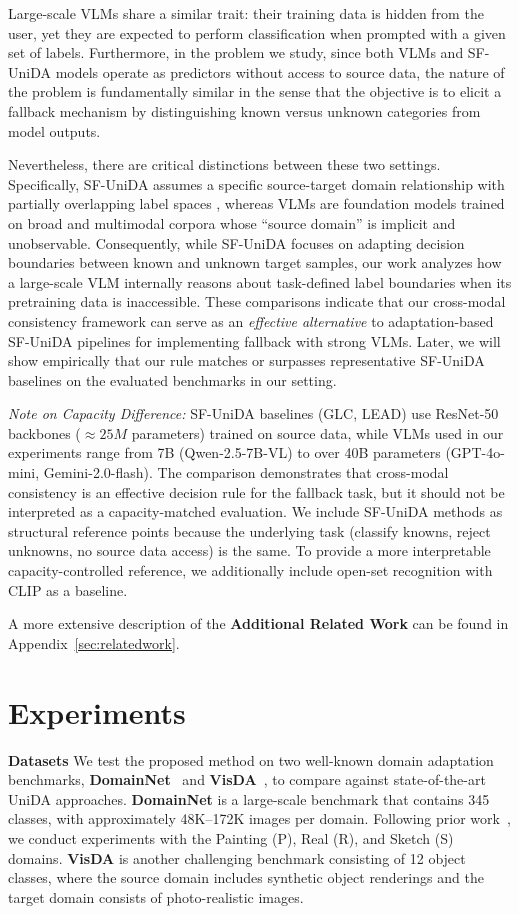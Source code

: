 \documentclass[10pt]{article} %
\begin{document}
Large-scale VLMs share a similar trait: their training data is hidden from the user, yet they are expected to perform classification when prompted with a given set of labels.
Furthermore, in the problem we study, since both VLMs and SF-UniDA models operate as predictors without access to source data, the nature of the problem is fundamentally similar in the sense that the objective is to elicit a fallback mechanism by distinguishing known versus unknown categories from model outputs.

Nevertheless, there are critical distinctions between these two settings.
Specifically, SF-UniDA assumes a specific source-target domain relationship with partially overlapping label spaces \citep{UDA_2019_CVPR}, whereas VLMs are foundation models trained on broad and multimodal corpora whose ``source domain'' is implicit and unobservable.
Consequently, while SF-UniDA focuses on adapting decision boundaries between known and unknown target samples, our work analyzes how a large-scale VLM internally reasons about task-defined label boundaries when its pretraining data is inaccessible.
These comparisons indicate that our cross-modal consistency framework can serve as an {\em effective alternative} to adaptation-based SF-UniDA pipelines for implementing fallback with strong VLMs. Later, we will show empirically that our rule matches or surpasses representative SF-UniDA baselines on the evaluated benchmarks in our setting.

{\em Note on Capacity Difference:} 
SF-UniDA baselines (GLC, LEAD) use ResNet-50 backbones ($\approx 25M$ parameters) trained on source data, while VLMs used in our experiments range from 7B (Qwen-2.5-7B-VL) to over 40B parameters (GPT-4o-mini, Gemini-2.0-flash). The comparison demonstrates that cross-modal consistency is an effective decision rule for the fallback task, but it should not be interpreted as a capacity-matched evaluation. We include SF-UniDA methods as structural reference points because the underlying task (classify knowns, reject unknowns, no source data access) is the same. To provide a more interpretable capacity-controlled reference, we additionally include open-set recognition with CLIP as a baseline.

A more extensive description of the {\bf Additional Related Work} can be found in Appendix~\ref{sec:relatedwork}.

\section{Experiments}
% 
\textbf{Datasets}
We test the proposed method on two well-known domain adaptation benchmarks, \textbf{DomainNet}~\citep{peng2019moment} and \textbf{VisDA}~\citep{peng2017visda}, to compare against state-of-the-art UniDA approaches.
\textbf{DomainNet} is a large-scale benchmark that contains 345 classes, with approximately 48K–172K images per domain.
Following prior work~\citep{qu2023upcycling,qu2024lead}, we conduct experiments with the Painting (P), Real (R), and Sketch (S) domains.
\textbf{VisDA} is another challenging benchmark consisting of 12 object classes, where the source domain includes synthetic object renderings and the target domain consists of photo-realistic images.
\end{document}
